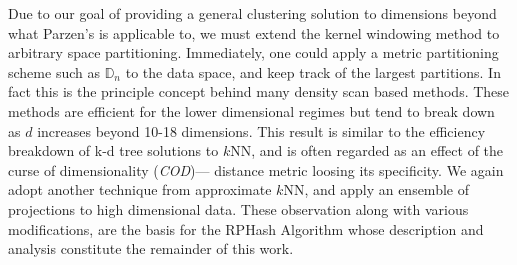 Due to our goal of providing a general clustering solution to dimensions beyond what Parzen's is applicable to, we must
extend the kernel windowing method to arbitrary space partitioning.  Immediately, one could apply a metric partitioning
scheme such as $\mathbb{D}_n$ to the data space, and keep track of the largest partitions.  In fact this is the
principle concept behind many density scan based methods.  These methods are efficient for the lower dimensional regimes
but tend to break down as $d$ increases beyond 10-18 dimensions.  This result is similar to the efficiency breakdown of
k-d tree solutions to $k$NN, and is often regarded as an effect of the curse of dimensionality (\emph{COD})--- distance
metric loosing its specificity.  We again adopt another technique from approximate $k$NN, and apply an ensemble of
projections to high dimensional data.
These observation along with various modifications, are the basis for the \textsf{RPHash} Algorithm whose description and
analysis constitute the remainder of this work.